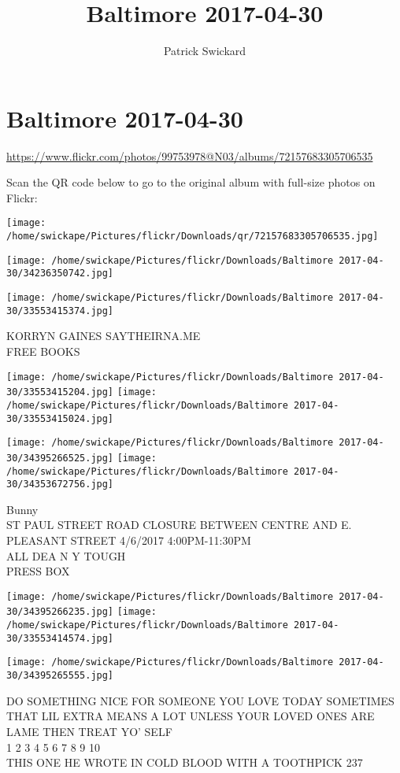 \documentclass[10pt,letterpaper]{article}
\title{Baltimore 2017-04-30}
\author{Patrick Swickard}
\date{}
\begin{document}
\section*{Baltimore 2017-04-30}

\url{https://www.flickr.com/photos/99753978@N03/albums/72157683305706535}

Scan the QR code below to go to the original album with full-size photos on Flickr:

\texttt{[image: /home/swickape/Pictures/flickr/Downloads/qr/72157683305706535.jpg]}
\pagebreak

\texttt{[image: /home/swickape/Pictures/flickr/Downloads/Baltimore 2017-04-30/34236350742.jpg]}

\vspace{0.25in}
\texttt{[image: /home/swickape/Pictures/flickr/Downloads/Baltimore 2017-04-30/33553415374.jpg]}

KORRYN GAINES SAYTHEIRNA.ME\\
FREE BOOKS
\pagebreak

\texttt{[image: /home/swickape/Pictures/flickr/Downloads/Baltimore 2017-04-30/33553415204.jpg]}
\texttt{[image: /home/swickape/Pictures/flickr/Downloads/Baltimore 2017-04-30/33553415024.jpg]}

\texttt{[image: /home/swickape/Pictures/flickr/Downloads/Baltimore 2017-04-30/34395266525.jpg]}
\texttt{[image: /home/swickape/Pictures/flickr/Downloads/Baltimore 2017-04-30/34353672756.jpg]}

Bunny\\
ST PAUL STREET ROAD CLOSURE BETWEEN CENTRE AND E. PLEASANT STREET 4/6/2017 4:00PM{-}11:30PM\\
ALL DEA N Y TOUGH\\
PRESS BOX
\pagebreak

\texttt{[image: /home/swickape/Pictures/flickr/Downloads/Baltimore 2017-04-30/34395266235.jpg]}
\texttt{[image: /home/swickape/Pictures/flickr/Downloads/Baltimore 2017-04-30/33553414574.jpg]}

\texttt{[image: /home/swickape/Pictures/flickr/Downloads/Baltimore 2017-04-30/34395265555.jpg]}

DO SOMETHING NICE FOR SOMEONE YOU LOVE TODAY SOMETIMES THAT LIL EXTRA MEANS A LOT UNLESS YOUR LOVED ONES ARE LAME THEN TREAT YO' SELF\\
1 2 3 4 5 6 7 8 9 10\\
THIS ONE HE WROTE IN COLD BLOOD WITH A TOOTHPICK 237
\pagebreak
\end{document}
